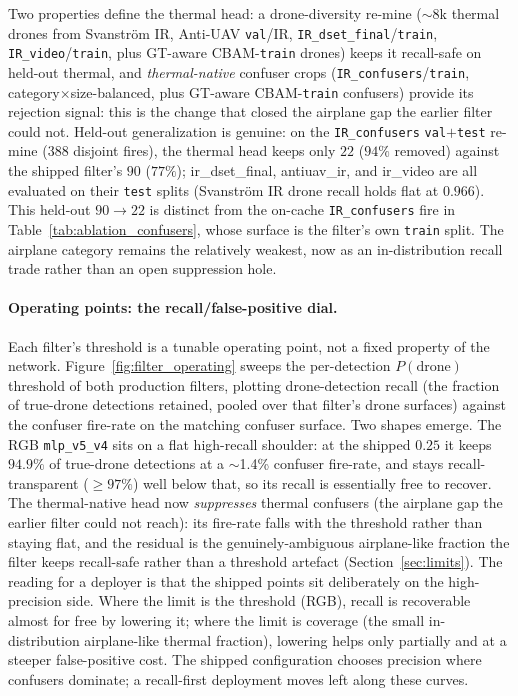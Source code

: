 Two properties define the thermal head: a drone-diversity re-mine ($\sim$8k thermal drones from Svanstr\"om IR, Anti-UAV \texttt{val}/IR, \texttt{IR\_dset\_final}/\texttt{train}, \texttt{IR\_video}/\texttt{train}, plus GT-aware CBAM-\texttt{train} drones) keeps it recall-safe on held-out thermal, and \emph{thermal-native} confuser crops (\texttt{IR\_confusers}/\texttt{train}, category$\times$size-balanced, plus GT-aware CBAM-\texttt{train} confusers) provide its rejection signal: this is the change that closed the airplane gap the earlier filter could not. Held-out generalization is genuine: on the \texttt{IR\_confusers} \texttt{val}$+$\texttt{test} re-mine ($388$ disjoint fires), the thermal head keeps only $22$ ($94\%$ removed) against the shipped filter's $90$ ($77\%$); ir\_dset\_final, antiuav\_ir, and ir\_video are all evaluated on their \texttt{test} splits (Svanstr\"om IR drone recall holds flat at $0.966$). This held-out $90\to22$ is distinct from the on-cache \texttt{IR\_confusers} fire in Table~\ref{tab:ablation_confusers}, whose surface is the filter's own \texttt{train} split. The airplane category remains the relatively weakest, now as an in-distribution recall trade rather than an open suppression hole.

\paragraph{Operating points: the recall/false-positive dial.}
Each filter's threshold is a tunable operating point, not a fixed property of the network. Figure~\ref{fig:filter_operating} sweeps the per-detection $P(\text{drone})$ threshold of both production filters, plotting drone-detection recall (the fraction of true-drone detections retained, pooled over that filter's drone surfaces) against the confuser fire-rate on the matching confuser surface. Two shapes emerge. The RGB \texttt{mlp\_v5\_v4} sits on a flat high-recall shoulder: at the shipped $0.25$ it keeps $94.9\%$ of true-drone detections at a $\sim$1.4\% confuser fire-rate, and stays recall-transparent ($\ge 97\%$) well below that, so its recall is essentially free to recover. The thermal-native head now \emph{suppresses} thermal confusers (the airplane gap the earlier filter could not reach): its fire-rate falls with the threshold rather than staying flat, and the residual is the genuinely-ambiguous airplane-like fraction the filter keeps recall-safe rather than a threshold artefact (Section~\ref{sec:limits}). The reading for a deployer is that the shipped points sit deliberately on the high-precision side. Where the limit is the threshold (RGB), recall is recoverable almost for free by lowering it; where the limit is coverage (the small in-distribution airplane-like thermal fraction), lowering helps only partially and at a steeper false-positive cost. The shipped configuration chooses precision where confusers dominate; a recall-first deployment moves left along these curves.

